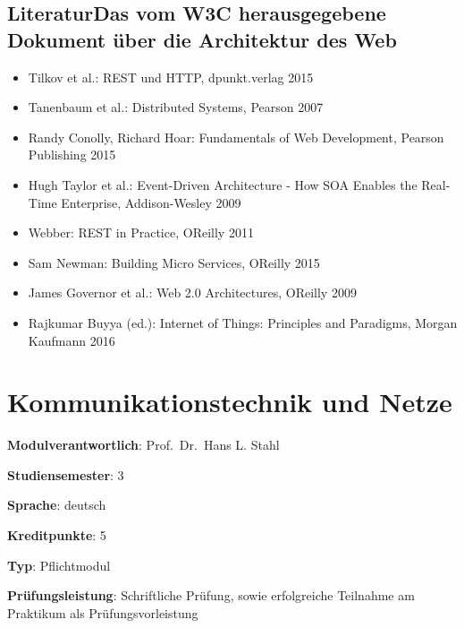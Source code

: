 \hypertarget{literaturdas-vom-w3c-herausgegebene-dokument-uxfcber-die-architektur-des-webpathlabelmi-2017modulbeschreibungen-bachelorba_grundlagen-des-web}{%
\section*{LiteraturDas vom W3C herausgegebene Dokument über die
Architektur des
Web\label{/mi-2017/modulbeschreibungen-bachelor/BA_Grundlagen-des-web}}\label{literaturdas-vom-w3c-herausgegebene-dokument-uxfcber-die-architektur-des-webpathlabelmi-2017modulbeschreibungen-bachelorba_grundlagen-des-web}}

\begin{itemize}
\tightlist
\item
  Tilkov et al.: REST und HTTP, dpunkt.verlag 2015
\item
  Tanenbaum et al.: Distributed Systems, Pearson 2007
\item
  Randy Conolly, Richard Hoar: Fundamentals of Web Development, Pearson
  Publishing 2015
\item
  Hugh Taylor et al.: Event-Driven Architecture - How SOA Enables the
  Real-Time Enterprise, Addison-Wesley 2009
\item
  Webber: REST in Practice, OReilly 2011
\item
  Sam Newman: Building Micro Services, OReilly 2015
\item
  James Governor et al.: Web 2.0 Architectures, OReilly 2009
\item
  Rajkumar Buyya (ed.): Internet of Things: Principles and Paradigms,
  Morgan Kaufmann 2016
\end{itemize}

\hypertarget{kommunikationstechnik-und-netzepathlabelmi-2017modulbeschreibungen-bachelorba_kommunikationstechnikundnetze}{%
\chapter{Kommunikationstechnik und
Netze\label{/mi-2017/modulbeschreibungen-bachelor/BA_KommunikationstechnikundNetze}}\label{kommunikationstechnik-und-netzepathlabelmi-2017modulbeschreibungen-bachelorba_kommunikationstechnikundnetze}}

\begin{modulHead}
\textbf{Modulverantwortlich}: Prof.~Dr.~Hans L.
Stahl
\end{modulHead}
\begin{modulHead}
\textbf{Studiensemester}:
3
\end{modulHead}
\begin{modulHead}
\textbf{Sprache}:
deutsch
\end{modulHead}
\begin{modulHead}
\textbf{Kreditpunkte}:
5
\end{modulHead}
\begin{modulHead}
\textbf{Typ}:
Pflichtmodul
\end{modulHead}
\begin{modulHead}
\textbf{Prüfungsleistung}:
Schriftliche Prüfung, sowie erfolgreiche Teilnahme am Praktikum als
Prüfungsvorleistung
\end{modulHead}


